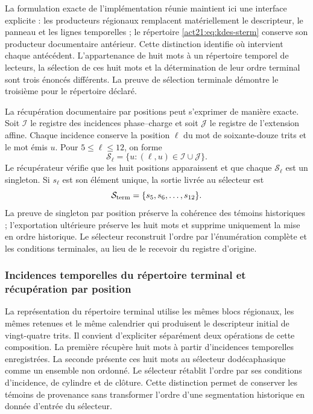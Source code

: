 La formulation exacte de l'implémentation réunie maintient ici une
interface explicite : les producteurs régionaux remplacent matériellement
le descripteur, le panneau et les lignes temporelles ; le répertoire
\eqref{act21:eq:kdes-sterm} conserve son producteur documentaire antérieur. Cette
distinction identifie où intervient chaque antécédent. L'appartenance de
huit mots à un répertoire temporel de lecteurs, la sélection de ces
huit mots et la détermination de leur ordre terminal sont trois
énoncés différents. La preuve de sélection terminale démontre le
troisième pour le répertoire déclaré.

La récupération documentaire par positions peut s'exprimer de manière
exacte. Soit $\mathcal I$ le registre des incidences phase--charge et soit
$\mathcal J$ le registre de l'extension affine. Chaque incidence conserve
la position $\ell$ du mot de soixante-douze trits et le mot
émis $u$. Pour $5\leq\ell\leq12$, on forme
\[
 \mathcal S_\ell=
 \{u:(\ell,u)\in\mathcal I\cup\mathcal J\}.
\]
Le récupérateur vérifie que les huit positions apparaissent et que chaque
$\mathcal S_\ell$ est un singleton. Si $s_\ell$ est son élément unique,
la sortie livrée au sélecteur est
\[
 \mathcal S_{\rm term}=\{s_5,s_6,\ldots,s_{12}\}.
\]
La preuve de singleton par position préserve la cohérence des témoins historiques ; l'exportation ultérieure préserve les huit mots et supprime uniquement la mise en ordre historique. Le sélecteur reconstruit l'ordre par l'énumération complète et les conditions terminales, au lieu de le recevoir du registre d'origine.

\subsubsection{Incidences temporelles du répertoire terminal et récupération par position}
\label{act21:sec:repertorio-incidencias-completas}

La représentation du répertoire terminal utilise les mêmes blocs régionaux,
les mêmes retenues et le même calendrier qui produisent le descripteur initial
de vingt-quatre trits. Il convient d'expliciter séparément deux opérations de
cette composition. La première récupère huit mots à partir d'incidences
temporelles enregistrées. La seconde présente ces huit mots au sélecteur
dodécaphasique comme un ensemble non ordonné. Le sélecteur rétablit
l'ordre par ses conditions d'incidence, de cylindre et de clôture.
Cette distinction permet de conserver les témoins de provenance sans transformer
l'ordre d'une segmentation historique en donnée d'entrée du sélecteur.

